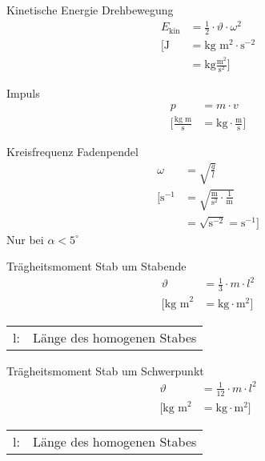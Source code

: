 \begin{karte}{Kinetische Energie Drehbewegung}
    \begin{align*}
        E_\text{kin} &= \frac{1}{2} \cdot \vartheta \cdot \omega^2 \\
        \bigg[ \text{J} &= \text{kg }\text{m}^2 \cdot \text{s}^{-2} \\
            &= \text{kg} \frac{\text{m}^2}{\text{s}^2} \bigg]
    \end{align*}
\end{karte}

\begin{karte}{Impuls}
    \begin{align*}
        p &= m \cdot v \\
        \bigg[ \frac{\text{kg m}}{\text{s}} &= \text{kg} \cdot \frac{\text{m}}{\text{s}} \bigg]
    \end{align*}
\end{karte}

\begin{karte}{Kreisfrequenz Fadenpendel}
    \begin{align*}
        \omega &= \sqrt{\frac{g}{l}} \\
        \bigg[ \text{s}^{-1} &= \sqrt{ \frac{\text{m}}{\text{s}^2} \cdot \frac{1}{\text{m}} } \\
            &= \sqrt{\text{s}^{-2}} = \text{s}^{-1} \bigg]
    \end{align*}
    Nur bei \(\alpha < 5^\circ\)
\end{karte}

\begin{karte}{Trägheitsmoment Stab um Stabende}
    \begin{align*}
        \vartheta &= \frac{1}{3} \cdot m \cdot l^2 \\
        \bigg[ \text{kg m}^2 &=
            \text{kg} \cdot \text{m}^2 
            \bigg]
    \end{align*}
    \begin{tabular}[t]{cl}
        l:& Länge des homogenen Stabes
    \end{tabular}
\end{karte}

\begin{karte}{Trägheitsmoment Stab um Schwerpunkt}
    \begin{align*}
        \vartheta &= \frac{1}{12} \cdot m \cdot l^2 \\
        \bigg[ \text{kg m}^2 &=
            \text{kg} \cdot \text{m}^2 
            \bigg]
    \end{align*}
    \begin{tabular}[t]{cl}
        l:& Länge des homogenen Stabes
    \end{tabular}
\end{karte}

